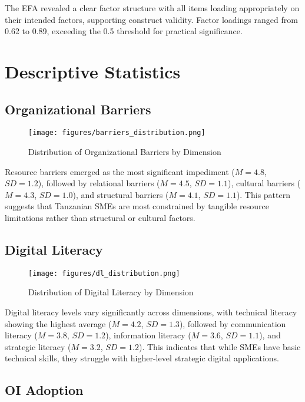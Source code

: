 The EFA revealed a clear factor structure with all items loading appropriately on their intended factors, supporting construct validity. Factor loadings ranged from 0.62 to 0.89, exceeding the 0.5 threshold for practical significance.

\section{Descriptive Statistics}

\subsection{Organizational Barriers}

\begin{figure}[H]
\centering
\texttt{[image: figures/barriers\_distribution.png]}
\caption{Distribution of Organizational Barriers by Dimension}
\label{fig:barriers_distribution}
\end{figure}

Resource barriers emerged as the most significant impediment ($M = 4.8$, $SD = 1.2$), followed by relational barriers ($M = 4.5$, $SD = 1.1$), cultural barriers ($M = 4.3$, $SD = 1.0$), and structural barriers ($M = 4.1$, $SD = 1.1$). This pattern suggests that Tanzanian SMEs are most constrained by tangible resource limitations rather than structural or cultural factors.

\subsection{Digital Literacy}

\begin{figure}[H]
\centering
\texttt{[image: figures/dl\_distribution.png]}
\caption{Distribution of Digital Literacy by Dimension}
\label{fig:dl_distribution}
\end{figure}

Digital literacy levels vary significantly across dimensions, with technical literacy showing the highest average ($M = 4.2$, $SD = 1.3$), followed by communication literacy ($M = 3.8$, $SD = 1.2$), information literacy ($M = 3.6$, $SD = 1.1$), and strategic literacy ($M = 3.2$, $SD = 1.2$). This indicates that while SMEs have basic technical skills, they struggle with higher-level strategic digital applications.

\subsection{OI Adoption}

